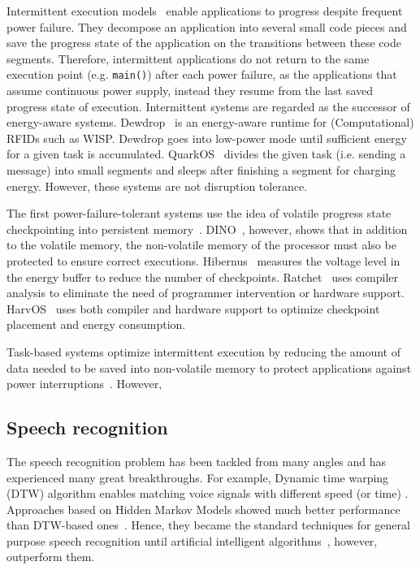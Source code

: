 Intermittent execution models~\cite{van2016intermittent,colin2016chain,lucia2015simpler,bhatti2017harvos} enable applications to progress despite frequent power failure. They decompose an application into several small code pieces and save the progress state of the application on the transitions between these code segments. Therefore, intermittent applications do not return to the same execution point (e.g. \texttt{main()}) after each power failure, as the applications that assume continuous power supply, instead they resume from the last saved progress state of execution.   
Intermittent systems are regarded as the successor of energy-aware systems. Dewdrop~\cite{buettner2011dewdrop} is an energy-aware runtime for (Computational) RFIDs such as WISP. 
Dewdrop goes into low-power mode until sufficient energy for a given task is accumulated. QuarkOS~\cite{zhang2013quarkos} divides the given task (i.e. sending a message) into small segments and sleeps after finishing a segment for charging energy. However, these systems are not disruption tolerance.  

The first power-failure-tolerant systems use the idea of volatile progress state checkpointing into persistent memory~\cite{mementos}. DINO~\cite{dino}, however, shows that in addition to the volatile memory, the non-volatile memory of the processor must also be protected to ensure correct executions. Hibernus~\cite{balsamo2015hibernus} measures the voltage level in the energy buffer to reduce the number of checkpoints. Ratchet~\cite{woude2016ratchet} uses compiler analysis to eliminate the need of programmer intervention or hardware support. HarvOS~\cite{bhatti2017harvos} uses both compiler and hardware support to optimize checkpoint placement and energy consumption.

Task-based systems optimize intermittent execution by reducing the amount of data needed to be saved into non-volatile memory to protect applications against power interruptions~\cite{colin2016chain}. However,  



\subsection{Speech recognition}
The speech recognition problem has been tackled from many angles and has experienced many great breakthroughs. For example, Dynamic time warping (DTW) algorithm enables matching voice signals with different speed (or time) \cite{}. Approaches based on Hidden Markov Models showed much better performance than DTW-based ones~\cite{jelinek1997statistical}. Hence, they became the standard techniques for general purpose speech recognition until artificial intelligent algorithms~\cite{hinton2012deep}, however, outperform them. 

